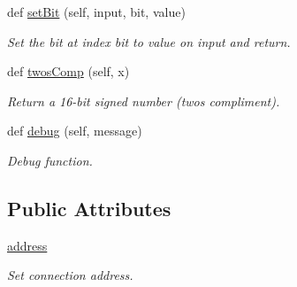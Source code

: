 \begin{DoxyCompactItemize}
def \mbox{\hyperlink{classlis3dh_1_1_l_i_s3_d_h_a8ce2903b2245be031b7d2bbf245075fa}{set\+Bit}} (self, input, bit, value)
\begin{DoxyCompactList}\small\item\em Set the bit at index \textquotesingle{}bit\textquotesingle{} to \textquotesingle{}value\textquotesingle{} on \textquotesingle{}input\textquotesingle{} and return. \end{DoxyCompactList}\item 
def \mbox{\hyperlink{classlis3dh_1_1_l_i_s3_d_h_a50ef59d0e77fae235ed31f2f6e6ae57c}{twos\+Comp}} (self, x)
\begin{DoxyCompactList}\small\item\em Return a 16-\/bit signed number (two\textquotesingle{}s compliment). \end{DoxyCompactList}\item 
def \mbox{\hyperlink{classlis3dh_1_1_l_i_s3_d_h_a6288984327a7bfffb09fdad1979c5a69}{debug}} (self, message)
\begin{DoxyCompactList}\small\item\em Debug function. \end{DoxyCompactList}\end{DoxyCompactItemize}
\subsection*{Public Attributes}
\begin{DoxyCompactItemize}
\item 
\mbox{\hyperlink{classlis3dh_1_1_l_i_s3_d_h_a0cd329009ec1fbf55f4789f59181cf04}{address}}
\begin{DoxyCompactList}\small\item\em Set connection address. \end{DoxyCompactList}\end{DoxyCompactItemize}
